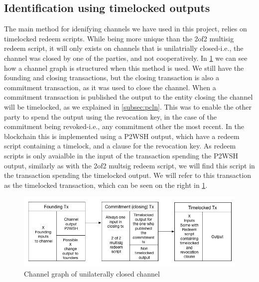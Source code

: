 \subsection{Identification using timelocked outputs}
\label{timelocked_identification}

The main method for idenifying channels we have used in this project, relies on timelocked redeem scripts.
While being more unique than the 2of2 multisig redeem script, it will only exists on channels that is unilatrially closed-i.e., the channel was closed by one of the parties, and not cooperatively.
In \cref{fig:ln_tx_graph} we can see how a channel graph is structured when this method is used.
We still have the founding and closing transactions, but the closing transaction is also a commitment transaction, as it was used to close the channel.
When a commitment transaction is published the output to the entity closing the channel will be timelocked, as we explained in \cref{subsec:pcln}.
This was to enable the other party to spend the output using the revocation key, in the case of the commitment being revoked-i.e., any commitment other the most recent.
In the blockchain this is implemented using a P2WSH output, which have a redeem script containing a timelock, and a clause for the revocation key.
As redeem scripts is only avaialble in the input of the transaction spending the P2WSH output, similarly as with the 2of2 multsig redeem script,
we will find this script in the transaction spending the timelocked output. 
We will refer to this transaction as the timelocked transaction, which can be seen on the right in \cref{fig:ln_tx_graph}.

\begin{figure}[h]
    \centering
    \includegraphics[width=15cm]{figures/chan_graph.png}
    \caption{Channel graph of unilaterally closed channel}
    \label{fig:ln_tx_graph}
\end{figure}

